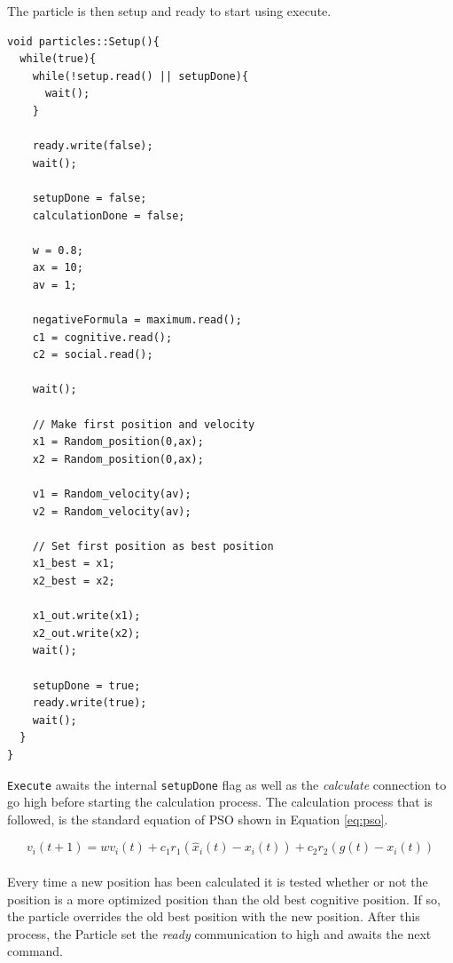 The particle is then setup and ready to start using execute.

\clearpage


\begin{lstlisting}[style=customc++, label={lst:particle_setup}, caption={Setup thread of Particle.}]
void particles::Setup(){
  while(true){
    while(!setup.read() || setupDone){
      wait();
    }

    ready.write(false);
    wait();

    setupDone = false;
    calculationDone = false;

    w = 0.8;
    ax = 10;
    av = 1;

    negativeFormula = maximum.read();
    c1 = cognitive.read();
    c2 = social.read();

    wait();

    // Make first position and velocity
    x1 = Random_position(0,ax);
    x2 = Random_position(0,ax);

    v1 = Random_velocity(av);
    v2 = Random_velocity(av);

    // Set first position as best position
    x1_best = x1;
    x2_best = x2;

    x1_out.write(x1);
    x2_out.write(x2);
    wait();

    setupDone = true;
    ready.write(true);
    wait();
  }
}
\end{lstlisting}

\texttt{Execute} awaits the internal \texttt{setupDone} flag as well as the \textit{calculate} connection to go high before starting the calculation process. The calculation process that is followed, is the standard equation of PSO shown in Equation \ref{eq:pso}.

\begin{equation}\label{eq:pso}
v_{i}(t+1)=wv_{i}(t)+c_{1}r_{1}(\hat{x}_{i}(t)-x_{i}(t))+c_{2}r_{2}(g(t)-x_{i}(t))
\end{equation}\\

Every time a new position has been calculated it is tested whether or not the position is a more optimized position than the old best cognitive position. If so, the particle overrides the old best position with the new position. After this process, the Particle set the \textit{ready} communication to high and awaits the next command.

\clearpage

